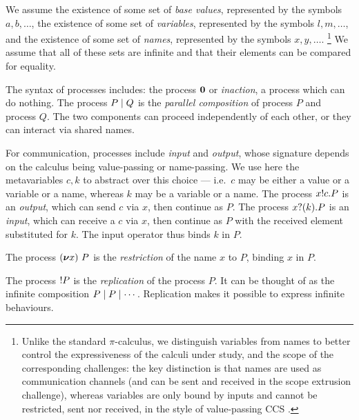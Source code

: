 \documentclass[runningheads]{llncs}
\begin{document}
We assume the existence of some set of \emph{base values}, represented by the symbols
\( a, b, \dots \), the existence of some set
of \emph{variables}, represented by the symbols
\( l, m, \dots \), and the existence of some set of \emph{names},
represented by the symbols \( x, y, \dots \).%
\footnote{%
  Unlike the standard $\pi$-calculus, we distinguish variables from names to
  better control the expressiveness of the calculi under study, and the scope of
  the corresponding challenges: the key distinction is that names are used as communication channels (and can be sent and received in the scope extrusion challenge), whereas variables are only bound by inputs and cannot be restricted, sent nor received, in the style of value-passing CCS \cite{Milner1989}.%
} %
We assume that all of these sets are infinite and that their elements can be
compared for equality.

The syntax of processes includes:
the process \( \bm{0} \) or \emph{inaction}, a process which can do nothing. The process \( P \mid Q \) is the \emph{parallel composition} of process \( P \) and process \( Q \).
The two components can proceed independently of each other, or they can interact via shared names.

For communication, processes include \emph{input} and \emph{output}, whose
signature depends on the calculus being value-passing or name-passing.
We use here the metavariables $c,k$ to abstract over this choice
--- i.e.~$c$ may be either a value or a variable or a name, whereas $k$ may
be a variable or a name.
The process \( x ! c . P \) is an \emph{output}, which can send
\( c \) via \( x \), then continue as \( P \).  %
The process \( x ? (k) . P \) is an \emph{input}, which can receive a $c$
via \( x \), then continue as \( P \) with the received element
substituted for \( k \).  The input operator thus
binds \( k \) in \( P \).

The process \( (\bm{\nu} x)~P \) is the \emph{restriction} of the name
\( x \) to \( P \), binding \( x \) in \( P \).


The process \( {!}P \) is the \emph{replication} of the process \( P \).
It can be thought of as the infinite composition \( P \mid P \mid \cdots \).
Replication makes it possible to express infinite behaviours.
\end{document}
